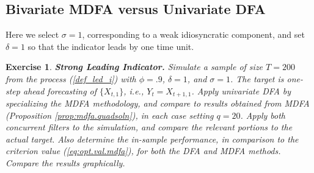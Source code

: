 \documentclass[a4paper]{book}
\newtheorem{Exercise}{Exercise}
\begin{document}
\subsection{Bivariate MDFA versus Univariate DFA}
 \label{bimdfaudfa}

Here   we select $\sigma=1$, corresponding to a weak
 idiosyncratic component, and set $\delta=1$ so that the indicator
 leads by one time unit.
 

\begin{Exercise} {\bf Strong Leading Indicator.} \rm
\label{exer:bimdfa-udfa}
 Simulate a sample of size $T=200$ from the process (\ref{def_led_i}) with
 $\phi = .9$, $\delta = 1$, and $\sigma = 1$.  The target is one-step
 ahead forecasting of $\{ X_{t,1} \}$, i.e., $Y_t = X_{t+1,1}$.
  Apply univariate DFA by specializing the MDFA methodology, and compare
 to results obtained from MDFA  (Proposition \ref{prop:mdfa.quadsoln}),
 in each case setting $q=20$.  
  Apply both concurrent filters 
 to the simulation, and compare the relevant portions to the actual
 target.  Also determine the in-sample performance, in comparison to the
   criterion value  (\ref{eq:opt.val.mdfa}), for both the DFA and MDFA methods.
 Compare the results graphically.
\end{Exercise}
\end{document}
